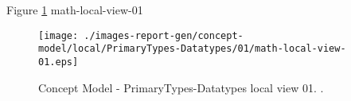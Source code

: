 Figure \ref{fig:lu.uni.lassy.excalibur.standard.specification.libraries-CM-view-local-PrimaryTypes-Datatypes-01} math-local-view-01



\begin{figure}[htbp] 
\label{fig:lu.uni.lassy.excalibur.standard.specification.libraries-CM}
\begin{center}
\texttt{[image: ./images-report-gen/concept-model/local/PrimaryTypes-Datatypes/01/math-local-view-01.eps]}
\end{center}
\caption[Concept Model - PrimaryTypes-Datatypes local view 01 - ]{Concept Model - PrimaryTypes-Datatypes local view 01. .}
\label{fig:lu.uni.lassy.excalibur.standard.specification.libraries-CM-view-local-PrimaryTypes-Datatypes-01}
\end{figure}
\vspace{0.5cm} 
